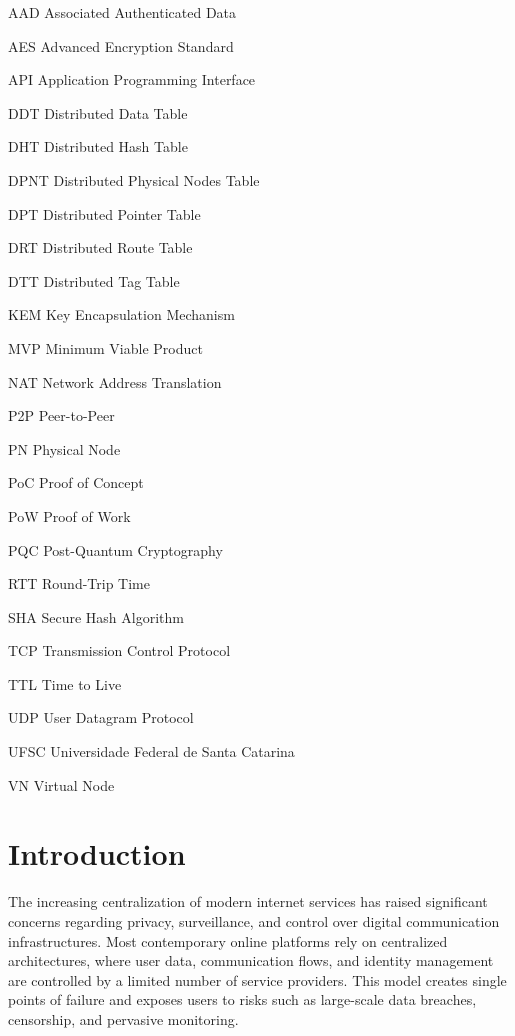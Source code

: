 \documentclass[
  12pt,
  oneside,
  a4paper,
  chapter=TITLE,
  section=TITLE,
  english,
  brazil
]{abntex2}
\begin{document}
\listoffigures*
\cleardoublepage
{}
\listoftables*
\cleardoublepage

\begin{siglas}
  \item[AAD] Associated Authenticated Data
  \item[AES] Advanced Encryption Standard
  \item[API] Application Programming Interface
  \item[DDT] Distributed Data Table
  \item[DHT] Distributed Hash Table
  \item[DPNT] Distributed Physical Nodes Table
  \item[DPT] Distributed Pointer Table
  \item[DRT] Distributed Route Table
  \item[DTT] Distributed Tag Table
  \item[KEM] Key Encapsulation Mechanism
  \item[MVP] Minimum Viable Product
  \item[NAT] Network Address Translation
  \item[P2P] Peer-to-Peer
  \item[PN] Physical Node
  \item[PoC] Proof of Concept
  \item[PoW] Proof of Work
  \item[PQC] Post-Quantum Cryptography
  \item[RTT] Round-Trip Time
  \item[SHA] Secure Hash Algorithm
  \item[TCP] Transmission Control Protocol
  \item[TTL] Time to Live
  \item[UDP] User Datagram Protocol
  \item[UFSC] Universidade Federal de Santa Catarina
  \item[VN] Virtual Node
\end{siglas}
\cleardoublepage

\tableofcontents*
\cleardoublepage

\textual
{}


\chapter{Introduction}
The increasing centralization of modern internet services has raised significant concerns regarding privacy, surveillance, and control over digital communication infrastructures. Most contemporary online platforms rely on centralized architectures, where user data, communication flows, and identity management are controlled by a limited number of service providers. This model creates single points of failure and exposes users to risks such as large-scale data breaches, censorship, and pervasive monitoring.
\end{document}
